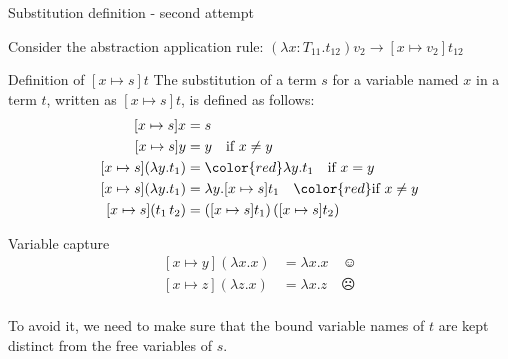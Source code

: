 \documentclass[8pt]{beamer}
\begin{document}
\begin{frame}{Substitution definition - second attempt}

    Consider the abstraction application rule:
        $(\lambda x:T_{11}.t_{12})v_{2} \rightarrow [x \mapsto v_{2}]t_{12}$

    \pause

    \begin{block}{Definition of $[x \mapsto s]t$}
        The substitution of a term $s$ for a variable named $x$ in a term $t$,
        written as $[x \mapsto s]t$, is defined as follows:
        \begin{displaymath}
            \begin{split}
                [x \mapsto s]x &= s \\
                [x \mapsto s]y &= y \quad \text{if } x \not = y\\
                [x \mapsto s](\lambda y.t_{1}) &= {\color{red} \lambda y. t_{1} 
                    \quad \text{if } x = y}\\
                [x \mapsto s](\lambda y.t_{1}) &= \lambda y. [x \mapsto s]t_{1} 
                    \quad {\color{red} \text{if } x \not = y}\\
                [x \mapsto s](t_{1} \, t_{2}) &= 
                    ([x \mapsto s]t_{1})\, ([x \mapsto s]t_{2})\\
            \end{split}
        \end{displaymath}        
    \end{block}

    \pause

    \begin{alertblock}{Variable capture}
        \begin{displaymath}
            \begin{split}
                [x \mapsto y](\lambda x.x) &= \lambda x.x \quad \smiley \\
                [x \mapsto z](\lambda z.x) &= \lambda x.z \quad \frownie\\ 
            \end{split}
        \end{displaymath}
    \end{alertblock}
    \pause
    To avoid it, we need to make sure that the bound variable names of $t$
    are kept distinct from the free variables of $s$.
\end{frame}
\end{document}
